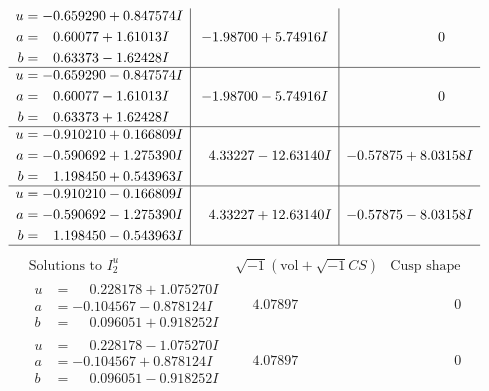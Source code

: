 \documentclass[1p]{elsarticle_modified}
\theoremstyle{definition}
\newcommand{\I}{\sqrt{-1}}
\begin{document}
$$\begin{array}{c|c|c}
\begin{aligned}
u &= -0.659290 + 0.847574 I \\
a &= \phantom{-}0.60077 + 1.61013 I \\
b &= \phantom{-}0.63373 - 1.62428 I\end{aligned}
 & -1.98700 + 5.74916 I & \phantom{-0.000000 } 0 \\ \hline\begin{aligned}
u &= -0.659290 - 0.847574 I \\
a &= \phantom{-}0.60077 - 1.61013 I \\
b &= \phantom{-}0.63373 + 1.62428 I\end{aligned}
 & -1.98700 - 5.74916 I & \phantom{-0.000000 } 0 \\ \hline\begin{aligned}
u &= -0.910210 + 0.166809 I \\
a &= -0.590692 + 1.275390 I \\
b &= \phantom{-}1.198450 + 0.543963 I\end{aligned}
 & \phantom{-}4.33227 - 12.63140 I & -0.57875 + 8.03158 I \\ \hline\begin{aligned}
u &= -0.910210 - 0.166809 I \\
a &= -0.590692 - 1.275390 I \\
b &= \phantom{-}1.198450 - 0.543963 I\end{aligned}
 & \phantom{-}4.33227 + 12.63140 I & -0.57875 - 8.03158 I\\
 \hline 
 \end{array}$$\newpage$$\begin{array}{c|c|c}  
\text{Solutions to }I^u_{2}& \I (\text{vol} + \sqrt{-1}CS) & \text{Cusp shape}\\
 \hline 
\begin{aligned}
u &= \phantom{-}0.228178 + 1.075270 I \\
a &= -0.104567 - 0.878124 I \\
b &= \phantom{-}0.096051 + 0.918252 I\end{aligned}
 & \phantom{-}4.07897\phantom{ +0.000000I} & \phantom{-0.000000 } 0 \\ \hline\begin{aligned}
u &= \phantom{-}0.228178 - 1.075270 I \\
a &= -0.104567 + 0.878124 I \\
b &= \phantom{-}0.096051 - 0.918252 I\end{aligned}
 & \phantom{-}4.07897\phantom{ +0.000000I} & \phantom{-0.000000 } 0 \\ \hline\begin{aligned}

\end{aligned}
\end{array}$$
\end{document}
